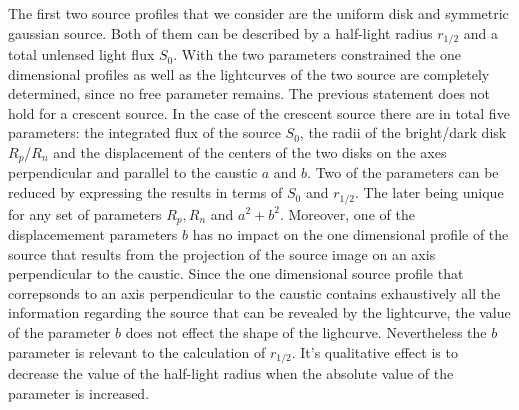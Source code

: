 The first two source profiles that we consider are the uniform disk and symmetric gaussian source. Both of them can be described by a half-light radius $r_{1/2}$ and a total unlensed light flux $S_0$. With the two parameters constrained the one dimensional profiles as well as the lightcurves of the two source are completely determined, since no free parameter remains. 
The previous statement does not hold for a crescent source. In the case of the crescent source there are in total five parameters: the integrated flux of the source $S_0$, the radii of the bright/dark disk $R_p$/$R_n$ and the displacement of the centers of the two disks on the axes perpendicular and parallel to the caustic $a$ and $b$. 
Two of the parameters can be reduced by expressing the results in terms of $S_0$ and $r_{1/2}$. The later being unique for any set of parameters $R_p, R_n$ and $a^2+b^2$. Moreover, one of the displacemement parameters $b$ has no impact on the one dimensional profile of the source that results from the projection of the source image on an axis perpendicular to the caustic. 
Since the one dimensional source profile that correpsonds to an axis perpendicular to the caustic contains exhaustively all the information regarding the source that can be revealed by the lightcurve, the value of the parameter $b$ does not effect the shape of the lighcurve. 
Nevertheless the $b$ parameter is relevant to the calculation of $r_{1/2}$. It's qualitative effect is to decrease the value of the half-light radius when the absolute value of the parameter is increased.  
